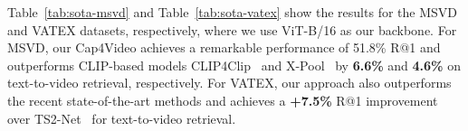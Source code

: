 \documentclass[10pt,twocolumn,letterpaper]{article}
\begin{document}
Table~\ref{tab:sota-msvd} and Table~\ref{tab:sota-vatex} show the results for the MSVD and VATEX datasets, respectively, where we use ViT-B/16 as our backbone. For MSVD, our Cap4Video achieves a remarkable performance of 51.8\% R@1 and outperforms CLIP-based models CLIP4Clip~\cite{luo2022clip4clip} and X-Pool~\cite{ma2022xclip} by \textbf{6.6\%} and \textbf{4.6\%} on text-to-video retrieval, respectively. For VATEX, our approach also outperforms the recent state-of-the-art methods and achieves a \textbf{+7.5\%} R@1 improvement over TS2-Net~\cite{liu2022ts2net} for text-to-video retrieval.


\begin{table}[b]
  \centering
    \setlength\tabcolsep{4pt}
  \vspace{-1mm}
  \caption{Results of text-to-video retrieval on the DiDeMo~\cite{anne2017didemo}.}
  \label{tab:sota-didemo}
\end{table}
\end{document}
